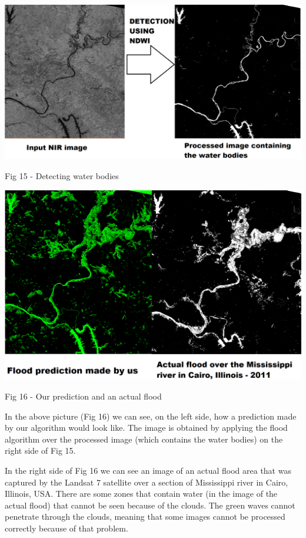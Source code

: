 \documentclass[12pt, a4paper]{report}
\begin{document}
\bigskip
\includegraphics[scale=0.3, left]{process1.png}
\begin{center}
Fig 15 - Detecting water bodies
\end{center}
\par 

\includegraphics[scale=0.4, center]{process3.png}
\begin{center}
Fig 16 - Our prediction and an actual flood
\end{center}
\par 

In the above picture (Fig 16) we can see, on the left side, how a prediction made by our algorithm would look like. The image is obtained by applying the flood algorithm over the processed image (which contains the water bodies) on the right side of Fig 15. \par 

In the right side of Fig 16 we can see an image of an actual flood area that was captured by the Landsat 7 satellite over a section of Mississippi river in Cairo, Illinois, USA. There are some zones  that contain water (in the image of the actual flood) that cannot be seen because of the clouds. The green waves cannot penetrate through the clouds, meaning that some images cannot be processed correctly because of that problem.
\par 
\end{document}
